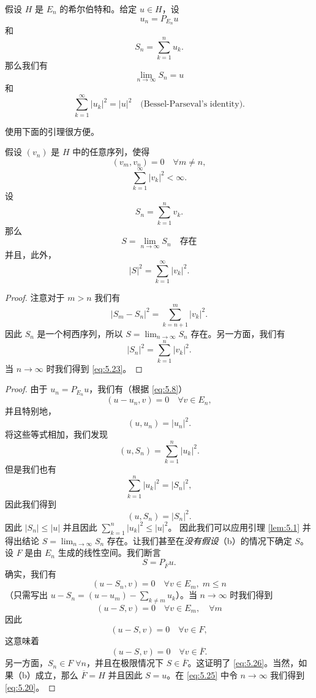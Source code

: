 \begin{theorem}\label{thm:5.9}
假设 $H$ 是 $E_n$ 的希尔伯特和。给定 $u \in H$，设
\[ u_n = P_{E_n} u \]
和
\[ S_n = \sum_{k=1}^n u_k. \]
那么我们有
\begin{equation}\label{eq:5.19}
\lim_{n\to\infty} S_n = u
\end{equation}
和
\begin{equation}\label{eq:5.20}
\sum_{k=1}^\infty |u_k|^2 = |u|^2 \quad \text{(Bessel-Parseval's identity)}.
\end{equation}
\end{theorem}
使用下面的引理很方便。
\begin{lemma}\label{lem:5.1}
假设 $(v_n)$ 是 $H$ 中的任意序列，使得
\begin{equation}\label{eq:5.21}
(v_m, v_n) = 0 \quad \forall m \ne n,
\end{equation}
\begin{equation}\label{eq:5.22}
\sum_{k=1}^\infty |v_k|^2 < \infty.
\end{equation}
设
\[ S_n = \sum_{k=1}^n v_k. \]
那么
\[ S = \lim_{n\to\infty} S_n \quad \text{存在} \]
并且，此外，
\begin{equation}\label{eq:5.23}
|S|^2 = \sum_{k=1}^\infty |v_k|^2.
\end{equation}
\end{lemma}
\begin{proof}
注意对于 $m>n$ 我们有
\[ |S_m - S_n|^2 = \sum_{k=n+1}^m |v_k|^2. \]
因此 $S_n$ 是一个柯西序列，所以 $S = \lim_{n\to\infty} S_n$ 存在。另一方面，我们有
\[ |S_n|^2 = \sum_{k=1}^n |v_k|^2. \]
当 $n\to\infty$ 时我们得到 \eqref{eq:5.23}。
\end{proof}
\begin{proof}
由于 $u_n = P_{E_n}u$，我们有（根据 \eqref{eq:5.8}）
\begin{equation}\label{eq:5.24}
(u-u_n, v) = 0 \quad \forall v \in E_n,
\end{equation}
并且特别地，
\[ (u,u_n) = |u_n|^2. \]
将这些等式相加，我们发现
\[ (u,S_n) = \sum_{k=1}^n |u_k|^2. \]
但是我们也有
\begin{equation}\label{eq:5.25}
\sum_{k=1}^n |u_k|^2 = |S_n|^2,
\end{equation}
因此我们得到
\[ (u,S_n) = |S_n|^2. \]
因此 $|S_n| \le |u|$ 并且因此 $\sum_{k=1}^n |u_k|^2 \le |u|^2$。
因此我们可以应用引理 \ref{lem:5.1} 并得出结论 $S = \lim_{n\to\infty} S_n$ 存在。让我们甚至在\textit{没有假设}（b）的情况下确定 $S$。设 $F$ 是由 $E_n$ 生成的线性空间。我们断言
\begin{equation}\label{eq:5.26}
S = P_{\overline{F}} u.
\end{equation}
确实，我们有
\[ (u-S_n, v) = 0 \quad \forall v \in E_m, \; m \le n \]
（只需写出 $u-S_n = (u-u_m) - \sum_{k \ne m} u_k$）。当 $n \to \infty$ 时我们得到
\[ (u-S,v) = 0 \quad \forall v \in E_m, \quad \forall m \]
因此
\[ (u-S,v) = 0 \quad \forall v \in F, \]
这意味着
\[ (u-S,v) = 0 \quad \forall v \in \overline{F}. \]
另一方面，$S_n \in F \; \forall n$，并且在极限情况下 $S \in \overline{F}$。这证明了 \eqref{eq:5.26}。当然，如果（b）成立，那么 $\overline{F}=H$ 并且因此 $S=u$。在 \eqref{eq:5.25} 中令 $n \to \infty$ 我们得到 \eqref{eq:5.20}。
\end{proof}

